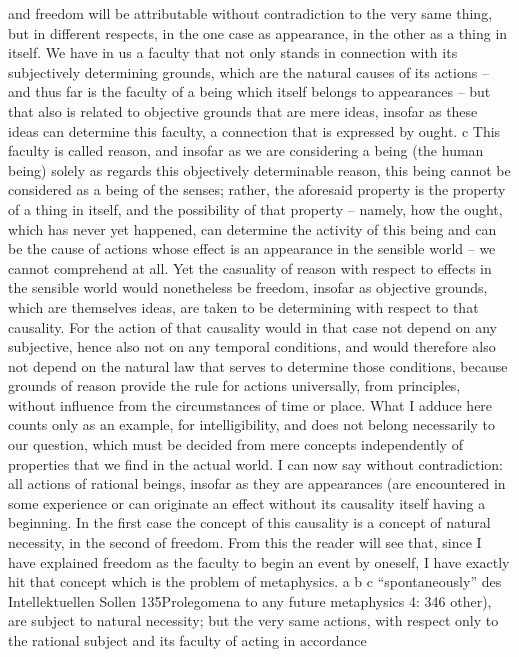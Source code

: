 and freedom will be attributable without contradiction to the very same
thing, but in different respects, in the one case as appearance, in the
other as a thing in itself.
We have in us a faculty that not only stands in connection with its
subjectively determining grounds, which are the natural causes of its
actions – and thus far is the faculty of a being which itself belongs to
appearances – but that also is related to objective grounds that are mere
ideas, insofar as these ideas can determine this faculty, a connection that
is expressed by ought. c This faculty is called reason, and insofar as we are
considering a being (the human being) solely as regards this objectively
determinable reason, this being cannot be considered as a being of the
senses; rather, the aforesaid property is the property of a thing in itself,
and the possibility of that property – namely, how the ought, which has
never yet happened, can determine the activity of this being and can be
the cause of actions whose effect is an appearance in the sensible world –
we cannot comprehend at all. Yet the casuality of reason with respect to
effects in the sensible world would nonetheless be freedom, insofar as
objective grounds, which are themselves ideas, are taken to be determining
with respect to that causality. For the action of that causality would in
that case not depend on any subjective, hence also not on any temporal
conditions, and would therefore also not depend on the natural law that
serves to determine those conditions, because grounds of reason provide
the rule for actions universally, from principles, without inﬂuence from
the circumstances of time or place.
What I adduce here counts only as an example, for intelligibility, and
does not belong necessarily to our question, which must be decided from
mere concepts independently of properties that we ﬁnd in the actual
world.
I can now say without contradiction: all actions of rational beings,
insofar as they are appearances (are encountered in some experience or
can originate an effect without its causality itself having a beginning. In the ﬁrst
case the concept of this causality is a concept of natural necessity, in the second
of freedom. From this the reader will see that, since I have explained freedom
as the faculty to begin an event by oneself, I have exactly hit that concept which
is the problem of metaphysics.
a
b
c
“spontaneously”
des Intellektuellen
Sollen
135Prolegomena to any future metaphysics
4: 346
other), are subject to natural necessity; but the very same actions, with
respect only to the rational subject and its faculty of acting in accordance
